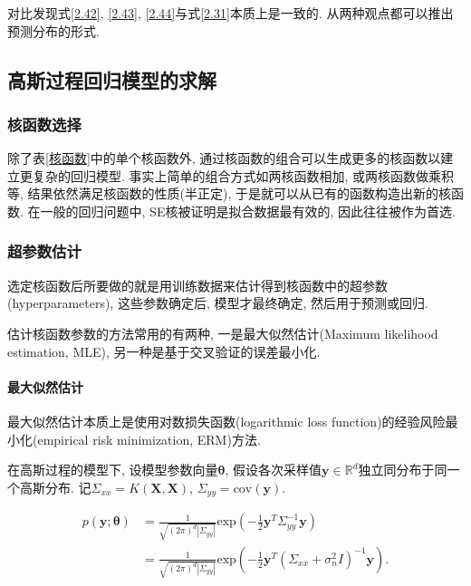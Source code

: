                对比发现式\ref{2.42}, \ref{2.43}, \ref{2.44}与式\ref{2.31}本质上是一致的. 从两种观点都可以推出预测分布的形式.


    \subsection{高斯过程回归模型的求解}

        \subsubsection{核函数选择}
            除了表\ref{核函数}中的单个核函数外, 通过核函数的组合可以生成更多的核函数以建立更复杂的回归模型. 事实上简单的组合方式如两核函数相加, 或两核函数做乘积等, 结果依然满足核函数的性质(半正定), 于是就可以从已有的函数构造出新的核函数\cite{rasmussen2006gaussian}. 在一般的回归问题中, SE核被证明是拟合数据最有效的, 因此往往被作为首选.

        \subsubsection{超参数估计}
            选定核函数后所要做的就是用训练数据来估计得到核函数中的超参数(hyperparameters), 这些参数确定后, 模型才最终确定, 然后用于预测或回归.

            估计核函数参数的方法常用的有两种, 一是最大似然估计(Maximum likelihood estimation, MLE), 另一种是基于交叉验证的误差最小化.

            \paragraph{最大似然估计}
                最大似然估计本质上是使用对数损失函数(logarithmic loss function)的经验风险最小化(empirical risk minimization, ERM)方法.

                在高斯过程的模型下, 设模型参数向量$\boldsymbol{\theta}$, 假设各次采样值$\boldsymbol{y}\in\mathds{R}^{d}$独立同分布于同一个高斯分布. 记$\Sigma_{xx}=K(\boldsymbol{X},\boldsymbol{X})$, $\Sigma_{yy}=\mathrm{cov}(\boldsymbol{y})$.

                \begin{equation}
                    \begin{aligned}
                        p(\boldsymbol{y};\boldsymbol{\theta}) &= \frac{1}{\sqrt{(2\pi)^{d}|\Sigma_{yy}|}}\mathrm{exp}\left(-\frac{1}{2}\boldsymbol{y}^{T}\Sigma_{yy}^{-1}\boldsymbol{y} \right) \\
                        &= \frac{1}{\sqrt{(2\pi)^{d}|\Sigma_{yy}|}}\mathrm{exp}\left(-\frac{1}{2}\boldsymbol{y}^{T}( \Sigma_{xx} + \sigma^{2}_{n}I)^{-1}\boldsymbol{y} \right).
                    \end{aligned}
                \end{equation}

